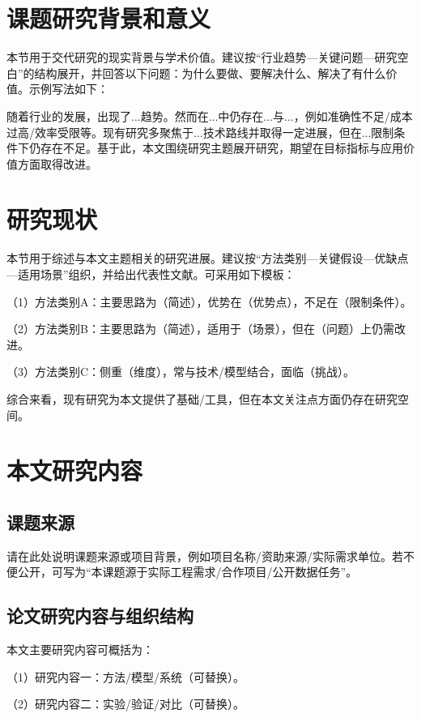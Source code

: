 \documentclass[unicode,master,submission,final]{scutthesis}
\begin{document}
\section{课题研究背景和意义}

本节用于交代研究的现实背景与学术价值。建议按“行业趋势—关键问题—研究空白”的结构展开，并回答以下问题：为什么要做、要解决什么、解决了有什么价值。示例写法如下：

随着行业的发展，出现了...趋势。然而在...中仍存在...与...，例如准确性不足/成本过高/效率受限等。现有研究多聚焦于...技术路线并取得一定进展，但在...限制条件下仍存在不足。基于此，本文围绕研究主题展开研究，期望在目标指标与应用价值方面取得改进。

\section{研究现状}

本节用于综述与本文主题相关的研究进展。建议按“方法类别—关键假设—优缺点—适用场景”组织，并给出代表性文献\cite{sample1,sample2,sample3}。可采用如下模板：

（1）方法类别A：主要思路为（简述），优势在（优势点），不足在（限制条件）。

（2）方法类别B：主要思路为（简述），适用于（场景），但在（问题）上仍需改进。

（3）方法类别C：侧重（维度），常与技术/模型结合，面临（挑战）。

综合来看，现有研究为本文提供了基础/工具，但在本文关注点方面仍存在研究空间。

\section{本文研究内容}

\subsection{课题来源}

请在此处说明课题来源或项目背景，例如项目名称/资助来源/实际需求单位。若不便公开，可写为“本课题源于实际工程需求/合作项目/公开数据任务”。

\subsection{论文研究内容与组织结构}

本文主要研究内容可概括为：

（1）研究内容一：方法/模型/系统（可替换）。

（2）研究内容二：实验/验证/对比（可替换）。
\end{document}
